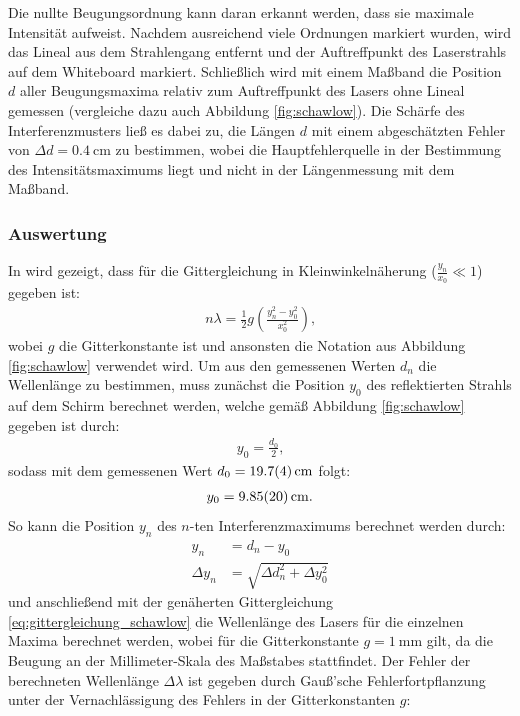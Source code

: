\documentclass[11pt, a4paper]{article}
\numberwithin{equation}{section}
\begin{document}
Die nullte Beugungsordnung kann daran erkannt werden, dass sie maximale Intensität aufweist.
Nachdem ausreichend viele Ordnungen markiert wurden, wird das Lineal aus dem Strahlengang entfernt und der Auftreffpunkt des Laserstrahls auf dem Whiteboard markiert.
Schließlich wird mit einem Maßband die Position $d$ aller Beugungsmaxima relativ zum Auftreffpunkt des Lasers ohne Lineal gemessen (vergleiche dazu auch Abbildung \ref{fig:schawlow}).
Die Schärfe des Interferenzmusters ließ es dabei zu, die Längen $d$ mit einem abgeschätzten Fehler von $\Delta d = \SI{0.4}{\centi\metre}$ zu bestimmen, wobei die Hauptfehlerquelle in der Bestimmung des Intensitätsmaximums liegt und nicht in der Längenmessung mit dem Maßband.

\subsubsection{Auswertung}
In \cite{schawlow} wird gezeigt, dass für die Gittergleichung in Kleinwinkelnäherung ($\frac{y_n}{x_0} \ll 1$) gegeben ist:
\begin{align}
	n \lambda = \frac{1}{2} g \left( \frac{y_n^2 - y_0^2}{x_0^2} \right) \text{,}
	\label{eq:gittergleichung_schawlow}
\end{align}
wobei $g$ die Gitterkonstante ist und ansonsten die Notation aus Abbildung \ref{fig:schawlow} verwendet wird.
Um aus den gemessenen Werten $d_n$ die Wellenlänge zu bestimmen, muss zunächst die Position $y_0$ des reflektierten Strahls auf dem Schirm berechnet werden, welche gemäß Abbildung \ref{fig:schawlow} gegeben ist durch:
\begin{align}
	y_0 = \frac{d_0}{2} \text{,}
\end{align}
sodass mit dem gemessenen Wert $d_0 = \SI{19.7 +- 0.4}{\centi\metre}$ folgt:
\begin{align}
	y_0 = \SI{9.85 +- 0.20}{\centi\metre} \text{.}
\end{align}
So kann die Position $y_n$ des $n$-ten Interferenzmaximums berechnet werden durch:
\begin{align}
	y_n &= d_n - y_0 \\
	\Delta y_n &= \sqrt{\Delta d_n^2 + \Delta y_0^2}
\end{align}
und anschließend mit der genäherten Gittergleichung \ref{eq:gittergleichung_schawlow} die Wellenlänge des Lasers für die einzelnen Maxima berechnet werden, wobei für die Gitterkonstante $g = \SI{1}{\milli\metre}$ gilt, da die Beugung an der Millimeter-Skala des Maßstabes stattfindet. 
Der Fehler der berechneten Wellenlänge $\Delta \lambda$ ist gegeben durch Gauß'sche Fehlerfortpflanzung unter der Vernachlässigung des Fehlers in der Gitterkonstanten $g$:
\end{document}
